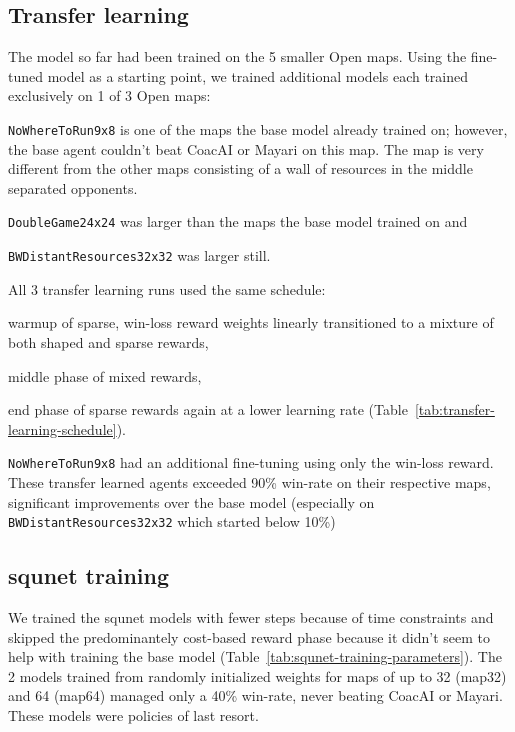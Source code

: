 \documentclass{article}
\begin{document}
\subsection{Transfer learning}
The model so far had been trained on the 5 smaller Open maps. Using the
fine-tuned model as a starting point, we trained additional models each trained exclusively
on 1 of 3 Open maps:
\begin{inparaenum}[(1)]
    \item \texttt{NoWhereToRun9x8} is one of the maps the base model already trained on;
    however, the base agent couldn't beat CoacAI or Mayari on this map. The map is very
    different from the other maps consisting of a wall of resources in the middle
    separated opponents.
    \item \texttt{DoubleGame24x24} was larger than the maps the base model trained on
    and
    \item \texttt{BWDistantResources32x32} was larger still.
\end{inparaenum}
All 3 transfer learning runs used the same schedule:
\begin{inparaenum}[(1)]
    \item warmup of sparse, win-loss reward weights linearly transitioned to a mixture
    of both shaped and sparse rewards,
    \item middle phase of mixed rewards,
    \item end phase of sparse rewards again at a lower learning rate (Table~\ref{tab:transfer-learning-schedule}).
\end{inparaenum}
\texttt{NoWhereToRun9x8} had an additional fine-tuning using only the win-loss reward.
These transfer learned agents exceeded 90\% win-rate on their respective maps,
significant improvements over the base model (especially on
\texttt{BWDistantResources32x32} which started below 10\%)

\subsection{squnet training}
We trained the squnet models with fewer steps because of time constraints and skipped the
predominantely cost-based reward phase because it didn't seem to help with training the
base model (Table~\ref{tab:squnet-training-parameters}). The 2 models trained from randomly 
initialized weights for maps of up to 32 (map32) and 64 (map64) managed only a 40\% 
win-rate, never beating CoacAI or Mayari. These models were policies of last resort.
\end{document}

